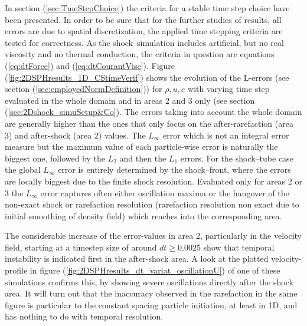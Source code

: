 \documentclass{report}
\begin{document}
In section (\ref{sec:TmeStepChoice}) the criteria for a stable time step choice have been presented. In order to be sure that for the further studies of results, all errors are due to spatial discretization, the applied time stepping criteria are tested for correctness. As the shock--simulation includes artificial, but no real viscosity and no thermal conduction, the criteria in question are equations (\ref{eq:dtForce}) and (\ref{eq:dtCourantVisc}). Figure (\ref{fig:2DSPHresults_1D_CStimeVerif}) shows the evolution of the L-errors (see section (\ref{sec:employedNormDefinition})) for $\rho, u, e$ with varying time step evaluated in the whole domain and in areas 2 and 3 only (see section (\ref{sec:2Dshock_simuSetup&Co}). 
The errors taking into account the whole domain are generally higher than the ones that only focus on the after-rarefaction (area 3) and after-shock (area 2) values. The $L_{\infty}$ error which is not an integral error measure but the maximum value of each particle-wise error is naturally the biggest one, followed by the $L_2$ and then the $L_1$ errors. For the shock--tube case the global $L_{\infty}$ error is entirely determined by the shock--front, where the errors are locally biggest due to the finite shock resolution. Evaluated only for areas 2 or 3 the $L_{\infty}$ error captures often either oscillation maxima or the hangover of the non-exact shock or rarefaction resolution (rarefaction resolution non exact due to initial smoothing of density field) which reaches into the corresponding area.

The considerable increase of the error-values in area 2, particularly in the velocity field, starting at a timestep size of around $dt\geq0.0025$ show that temporal instability is indicated first in the after-shock area. A look at the plotted velocity-profile in figure (\ref{fig:2DSPHresults_dt_variat_oscillationU}) of one of these simulations confirms this, by showing severe oscillations directly after the shock area. It will turn out that the inaccuracy observed in the rarefaction in the same figure is particular to the constant spacing particle initiation, at least in 1D, and has nothing to do with temporal resolution.
\end{document}
